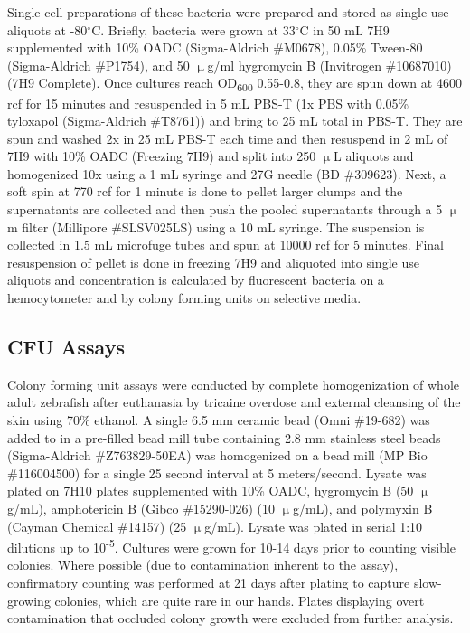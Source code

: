 Single cell preparations of these bacteria were prepared and stored as single-use aliquots at -80$^{\circ}$C. Briefly, bacteria were grown at 33$^{\circ}$C in 50 mL 7H9 supplemented with 10\% OADC (Sigma-Aldrich \#M0678), 0.05\% Tween-80 (Sigma-Aldrich \#P1754), and 50 $\upmu$g/ml hygromycin B (Invitrogen \#10687010) (7H9 Complete). Once cultures reach OD\textsubscript{600} 0.55-0.8, they are spun down at 4600 rcf for 15 minutes and resuspended in 5 mL PBS-T (1x PBS with 0.05\% tyloxapol (Sigma-Aldrich \#T8761)) and bring to 25 mL total in PBS-T. They are spun and washed 2x in 25 mL PBS-T each time and then resuspend in 2 mL of 7H9 with 10\% OADC (Freezing 7H9) and split into 250 $\upmu$L aliquots and homogenized 10x using a 1 mL syringe and 27G needle (BD \#309623). Next, a soft spin at 770 rcf for 1 minute is done to pellet larger clumps and the supernatants are collected and then push the pooled supernatants through a 5 $\upmu$m filter (Millipore \#SLSV025LS) using a 10 mL syringe. The suspension is collected in 1.5 mL microfuge tubes and spun at 10000 rcf for 5 minutes. Final resuspension of pellet is done in freezing 7H9 and aliquoted into single use aliquots and concentration is calculated by fluorescent bacteria on a hemocytometer and by colony forming units on selective media.

\subsection{CFU Assays}

Colony forming unit assays were conducted by complete homogenization of whole adult zebrafish after euthanasia by tricaine overdose and external cleansing of the skin using 70\% ethanol. A single 6.5 mm ceramic bead (Omni \#19-682) was added to in a pre-filled bead mill tube containing 2.8 mm stainless steel beads (Sigma-Aldrich \#Z763829-50EA) was homogenized on a bead mill (MP Bio \#116004500) for a single 25 second interval at 5 meters/second. Lysate was plated on 7H10 plates supplemented with 10\% OADC,  hygromycin B (50 $\upmu$g/mL), amphotericin B (Gibco \#15290-026) (10 $\upmu$g/mL), and polymyxin B (Cayman Chemical \#14157) (25 $\upmu$g/mL). Lysate was plated in serial 1:10 dilutions up to 10\textsuperscript{-5}. Cultures were grown for 10-14 days prior to counting visible colonies. Where possible (due to contamination inherent to the assay), confirmatory counting was performed at 21 days after plating to capture slow-growing colonies, which are quite rare in our hands. Plates displaying overt contamination that occluded colony growth were excluded from further analysis.


